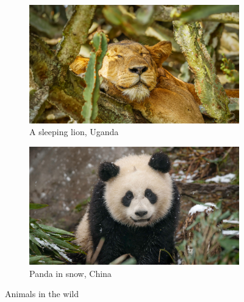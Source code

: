 \documentclass[a4paper]{article}
\begin{document}
    \begin{figure}
        \begin{subfigure}{0.45\linewidth}
            \includegraphics[width=\linewidth]{resources/lion.jpg}
            \caption{A sleeping lion, Uganda} 
        \end{subfigure}
        \hfill 
        \begin{subfigure}{0.45\linewidth}  
            \includegraphics[width=\linewidth]{resources/panda.jpg} 
            \caption{Panda in snow, China}  
        \end{subfigure}
        \caption{Animals in the wild} 
    \end{figure}
\end{document}
